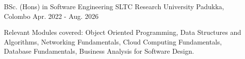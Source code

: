 

\begin{cventries}

  \cventry
    {BSc. (Hons) in Software Engineering} %
    {SLTC Research University} %
    {Padukka, Colombo} %
    {Apr. 2022 - Aug. 2026} %
    {
      \begin{cvitems} %
        \item {Relevant Modules covered: Object Oriented Programming, Data Structures and Algorithms, Networking Fundamentals, Cloud Computing Fundamentals, Database Fundamentals, Business Analysis for Software Design.}
      \end{cvitems}
    }

\end{cventries}
